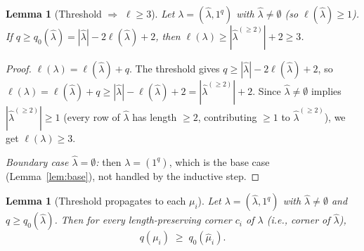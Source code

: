 \documentclass[11pt]{article}
\newtheorem{lemma}[theorem]{Lemma}
\theoremstyle{definition}
\begin{document}
\begin{lemma}[Threshold $\Rightarrow$ $\ell \ge 3$]\label{lem:threshold-ell}
Let $\lambda = (\hat\lambda, 1^q)$ with $\hat\lambda \ne \emptyset$
(so $\ell(\hat\lambda) \ge 1$). If
$q \ge q_0(\hat\lambda) = |\hat\lambda| - 2\ell(\hat\lambda) + 2$, then
$\ell(\lambda) \ge |\hat\lambda^{(\ge 2)}| + 2 \ge 3$.
\end{lemma}

\begin{proof}
$\ell(\lambda) = \ell(\hat\lambda) + q$. The threshold gives
$q \ge |\hat\lambda| - 2\ell(\hat\lambda) + 2$, so
$\ell(\lambda) = \ell(\hat\lambda) + q \ge |\hat\lambda| - \ell(\hat\lambda) + 2
= |\hat\lambda^{(\ge 2)}| + 2$.
Since $\hat\lambda \ne \emptyset$ implies
$|\hat\lambda^{(\ge 2)}| \ge 1$ (every row of $\hat\lambda$ has
length $\ge 2$, contributing $\ge 1$ to $\hat\lambda^{(\ge 2)}$), we
get $\ell(\lambda) \ge 3$.

\emph{Boundary case $\hat\lambda = \emptyset$:} then $\lambda = (1^q)$,
which is the base case (Lemma~\ref{lem:base}), not handled by the
inductive step.
\end{proof}

\begin{lemma}[Threshold propagates to each $\mu_i$]\label{lem:threshold-propagate}
Let $\lambda = (\hat\lambda, 1^q)$ with $\hat\lambda \ne \emptyset$
and $q \ge q_0(\hat\lambda)$. Then for every length-preserving corner
$c_i$ of $\lambda$ (i.e., corner of $\hat\lambda$),
\[
   q(\mu_i) \;\ge\; q_0(\hat\mu_i).
\]
\end{lemma}
\end{document}
